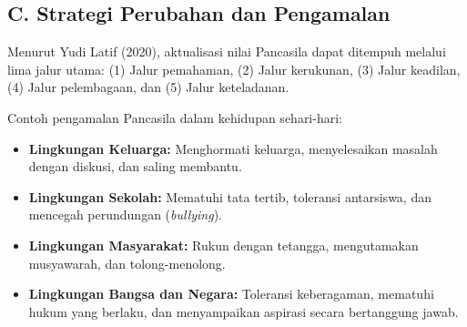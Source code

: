 \subsection{C. Strategi Perubahan dan Pengamalan}
Menurut Yudi Latif (2020), aktualisasi nilai Pancasila dapat ditempuh melalui lima jalur utama: (1) Jalur pemahaman, (2) Jalur kerukunan, (3) Jalur keadilan, (4) Jalur pelembagaan, dan (5) Jalur keteladanan.

Contoh pengamalan Pancasila dalam kehidupan sehari-hari:
\begin{itemize}
    \item \textbf{Lingkungan Keluarga:} Menghormati keluarga, menyelesaikan masalah dengan diskusi, dan saling membantu.
    \item \textbf{Lingkungan Sekolah:} Mematuhi tata tertib, toleransi antarsiswa, dan mencegah perundungan (\textit{bullying}).
    \item \textbf{Lingkungan Masyarakat:} Rukun dengan tetangga, mengutamakan musyawarah, dan tolong-menolong.
    \item \textbf{Lingkungan Bangsa dan Negara:} Toleransi keberagaman, mematuhi hukum yang berlaku, dan menyampaikan aspirasi secara bertanggung jawab.
\end{itemize}